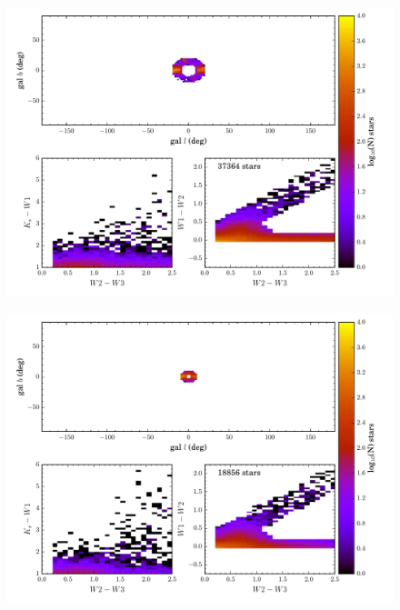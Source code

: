 \begin{figure}[h]
\includegraphics[width=6.5in]{figs/color_and_map_candidates_region3.pdf}
\caption{\label{fig:color_map_candidates3}}
\end{figure}

\begin{figure}[h]
\includegraphics[width=6.5in]{figs/color_and_map_candidates_region4.pdf}
\caption{\label{fig:color_map_candidates4}}
\end{figure}

